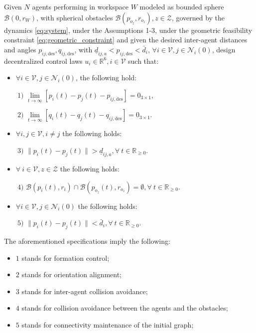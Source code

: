 \begin{problem} \label{problem}
	Given $N$ agents performing in workspace $W$ modeled as bounded sphere
  $\mathcal{B}(0,r_W)$, with spherical obstacles
  $\mathcal{B}(p_{o_z}, r_{o_z}), z \in \mathcal{Z}$, governed by the dynamics
  \eqref{eq:system}, under the Assumptions 1-3, under the geometric feasibility
  constraint \eqref{eq:geometric_constraint} and given the desired inter-agent
  distances and angles $p_{ij, \text{des}}, q_{ij, \text{des}}$, with
  $\underline{d}_{ij, a} < p_{ij, \text{des}} < \bar{d}_{i}$, $\forall i \in \mathcal{V}, j \in \mathcal{N}_i(0)$,
  design decentralized control laws $u_i \in\mathbb{R}^6,i\in\mathcal{V}$
  such that:

	\begin{itemize}
		\item $\forall i \in \mathcal{V}, j \in \mathcal{N}_i(0)$,
      the following hold:

		$\ 1)$ $\lim\limits_{t \to \infty} \left[ p_{i}(t)-p_{j}(t) - p_{ij, \text{des}} \right] = 0_{3\times1}$,

		$\ 2)$ $\lim\limits_{t \to \infty} \left[q_{i}(t) - q_{j}(t) - q_{ij, \text{des}}\right] = 0_{3\times1}$.

		\item \noindent $\forall i,j \in \mathcal{V}, i \neq j$ the following holds:

		$\ 3)$ $\|p_i(t)-p_j(t)\| > \underline{d}_{ij, a}, \forall \ t \in \mathbb{R}_{\geq 0}$.
		\item $\forall \ i \in \mathcal{V}, z \in \mathcal{Z}$ the following holds:

		$\ 4)$ $\mathcal{B}(p_i(t), r_i) \cap \mathcal{B}(p_{o_z}(t), r_{o_z}) = \emptyset, \forall \ t \in \mathbb{R}_{\geq 0}$.

		\item $\forall i \in \mathcal{V}, j \in \mathcal{N}_i(0)$ the following holds:

		$\ 5)$ $\|p_i(t)-p_j(t)\| < \bar{d}_{i}, \forall \ t \in \mathbb{R}_{\geq 0}$.
	\end{itemize}

\end{problem}

\noindent The aforementioned specifications imply the following:
\begin{itemize}
	\item $1$ stands for formation control;
	\item $2$ stands for orientation alignment;
	\item $3$ stands for inter-agent collision avoidance;
	\item $4$ stands for collision avoidance between the agents and the obstacles;
	\item $5$ stands for connectivity maintenance of the initial graph;
\end{itemize}
